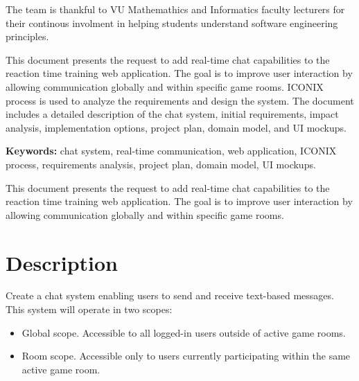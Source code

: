 \documentclass[]{VUMIFTemplateClass}
\newcommand{\EE}{\mathbb{E}\,} %
\begin{document}
The team is thankful to VU Mathemathics and Informatics faculty lecturers for their continous involment in helping students understand software engineering principles.

This document presents the request to add real-time chat capabilities to the reaction time training web application. The goal is to improve user interaction  by allowing communication globally and within specific game rooms. ICONIX process is used to analyze the requirements and design the system. The document includes a detailed description of the chat system, initial requirements, impact analysis, implementation options, project plan, domain model, and UI mockups.

\textbf{Keywords:} chat system, real-time communication, web application, ICONIX process, requirements analysis, project plan, domain model, UI mockups.





\singlespacing
{}
\listoffigures 


\tableofcontents
\onehalfspacing






This document presents the request to add real-time chat capabilities to the reaction time training web application. The goal is to improve user interaction  by allowing communication globally and within specific game rooms.

\section{Description}
Create a chat system enabling users to send and receive text-based messages. This system will operate in two scopes:
\begin{itemize}
\item Global scope. Accessible to all logged-in users outside of active game rooms.
\item Room scope. Accessible only to users currently participating within the same active game room.
\end{itemize}
\end{document}
